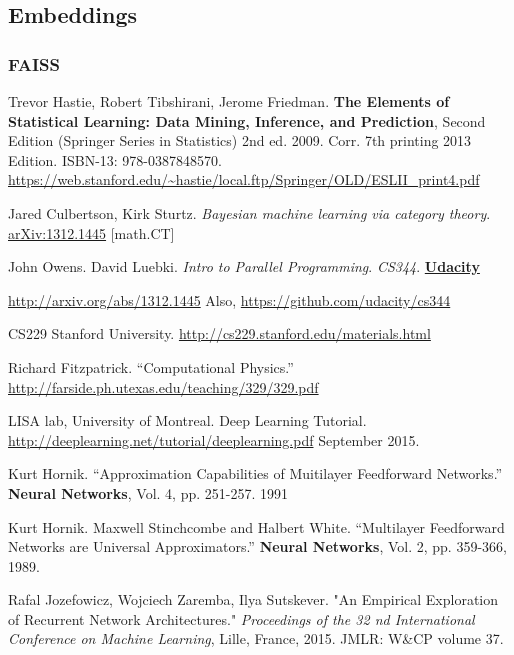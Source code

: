 \documentclass[10pt]{amsart}
\begin{document}
\begin{multicols*}{2}
\part{Embeddings}

\section{FAISS}



\end{multicols*}
\begin{thebibliography}{9}
Trevor Hastie, Robert Tibshirani, Jerome Friedman.   \textbf{The Elements of Statistical Learning: Data Mining, Inference, and Prediction}, Second Edition (Springer Series in Statistics) 2nd ed. 2009. Corr. 7th printing 2013 Edition.  ISBN-13: 978-0387848570.  \url{https://web.stanford.edu/~hastie/local.ftp/Springer/OLD/ESLII_print4.pdf}

Jared Culbertson, Kirk Sturtz.  \emph{Bayesian machine learning via category theory}.  \href{http://arxiv.org/abs/1312.1445}{arXiv:1312.1445} [math.CT]

John Owens.  David Luebki.  \emph{Intro to Parallel Programming}.  \emph{CS344}.  \textbf{\href{https://www.udacity.com/}{Udacity}}  
  
\url{http://arxiv.org/abs/1312.1445} Also, \url{https://github.com/udacity/cs344}  

CS229 Stanford University.  \url{http://cs229.stanford.edu/materials.html}


Richard Fitzpatrick.  ``Computational Physics.''  \url{http://farside.ph.utexas.edu/teaching/329/329.pdf}

LISA lab, University of Montreal.  Deep Learning Tutorial.  \url{http://deeplearning.net/tutorial/deeplearning.pdf}  September 2015.  



Kurt Hornik. ``Approximation Capabilities of Muitilayer Feedforward Networks.''  \textbf{Neural Networks}, Vol. 4, pp. 251-257. 1991

Kurt Hornik. Maxwell Stinchcombe and Halbert White.  ``Multilayer Feedforward Networks are Universal Approximators.''  \textbf{Neural Networks}, Vol. 2, pp. 359-366, 1989.  


Rafal Jozefowicz, Wojciech Zaremba, Ilya Sutskever.  "An Empirical Exploration of Recurrent Network Architectures."  \emph{Proceedings of the 32 nd International Conference on Machine Learning}, Lille, France, 2015. JMLR: W\&CP volume 37.


\end{thebibliography}
\end{document}
